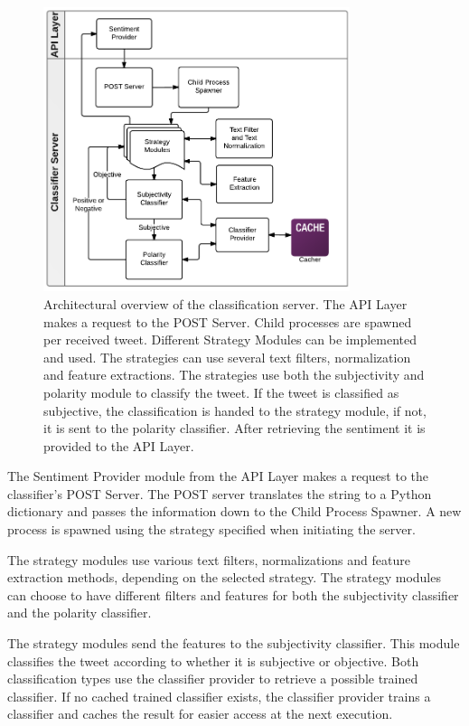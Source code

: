 \begin{figure}[htb]
 \begin{center}
     \includegraphics[width=0.8\textwidth]{./figs/ClassifierArcitechture.pdf}
 \end{center}
 \caption[Architectural overview of the classification server.]{Architectural overview of the classification server. The API Layer makes a request to the POST Server. Child processes are spawned per received tweet. Different Strategy Modules can be implemented and used. The strategies can use several text filters, normalization and feature extractions. The strategies use both the subjectivity and polarity module to classify the tweet. If the tweet is classified as subjective, the classification is handed to the strategy module, if not, it is sent to the polarity classifier. After retrieving the sentiment it is provided to the API Layer.}
 \label{fig:ClassifierArcitechture}
\end{figure}

The Sentiment Provider module from the API Layer makes a request to the classifier's POST Server. The POST server translates the string to a Python dictionary and passes the information down to the Child Process Spawner. A new process is spawned using the strategy specified when initiating the server. 

The strategy modules use various text filters, normalizations and feature extraction methods, depending on the selected strategy. The strategy modules can choose to have different filters and features for both the subjectivity classifier and the polarity classifier. 

The strategy modules send the features to the subjectivity classifier. This module classifies the tweet according to whether it is subjective or objective. Both classification types use the classifier provider to retrieve a possible trained classifier. If no cached trained classifier exists, the classifier provider trains a classifier and caches the result for easier access at the next execution. 

